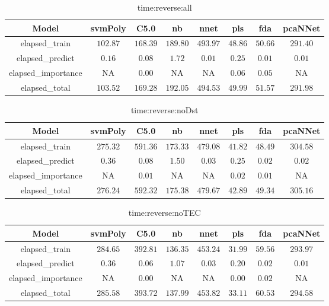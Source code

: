 \begin{table}[!ht]
	\centering
	\begin{tabular}{|c|c|c|c|c|c|c|c|}
		\hline
		Model & svmPoly & C5.0 & nb & nnet & pls & fda & pcaNNet \\ \hline
		elapsed_train & $102.87$ & $168.39$ & $189.80$ & $493.97$ & $48.86$ & $50.66$ & $291.40$ \\ \hline
		elapsed_predict & $0.16$ & $0.08$ & $1.72$ & $0.01$ & $0.25$ & $0.01$ & $0.01$ \\ \hline
		elapsed_importance & NA & $0.00$ & NA & NA & $0.06$ & $0.05$ & NA \\ \hline
		elapsed_total & $103.52$ & $169.28$ & $192.05$ & $494.53$ & $49.99$ & $51.57$ & $291.98$ \\ \hline
	\end{tabular}
	\caption{time:reverse:all}
	\label{tab:time:reverse:all}
\end{table}

\begin{table}[!ht]
	\centering
	\begin{tabular}{|c|c|c|c|c|c|c|c|}
		\hline
		Model & svmPoly & C5.0 & nb & nnet & pls & fda & pcaNNet \\ \hline
		elapsed_train & $275.32$ & $591.36$ & $173.33$ & $479.08$ & $41.82$ & $48.49$ & $304.58$ \\ \hline
		elapsed_predict & $0.36$ & $0.08$ & $1.50$ & $0.03$ & $0.25$ & $0.02$ & $0.02$ \\ \hline
		elapsed_importance & NA & $0.01$ & NA & NA & $0.02$ & $0.01$ & NA \\ \hline
		elapsed_total & $276.24$ & $592.32$ & $175.38$ & $479.67$ & $42.89$ & $49.34$ & $305.16$ \\ \hline
	\end{tabular}
	\caption{time:reverse:noDst}
	\label{tab:time:reverse:noDst}
\end{table}

\begin{table}[!ht]
	\centering
	\begin{tabular}{|c|c|c|c|c|c|c|c|}
		\hline
		Model & svmPoly & C5.0 & nb & nnet & pls & fda & pcaNNet \\ \hline
		elapsed_train & $284.65$ & $392.81$ & $136.35$ & $453.24$ & $31.99$ & $59.56$ & $293.97$ \\ \hline
		elapsed_predict & $0.36$ & $0.06$ & $1.07$ & $0.03$ & $0.20$ & $0.02$ & $0.01$ \\ \hline
		elapsed_importance & NA & $0.00$ & NA & NA & $0.00$ & $0.02$ & NA \\ \hline
		elapsed_total & $285.58$ & $393.72$ & $137.99$ & $453.82$ & $33.11$ & $60.53$ & $294.58$ \\ \hline
	\end{tabular}
	\caption{time:reverse:noTEC}
	\label{tab:time:reverse:noTEC}
\end{table}

